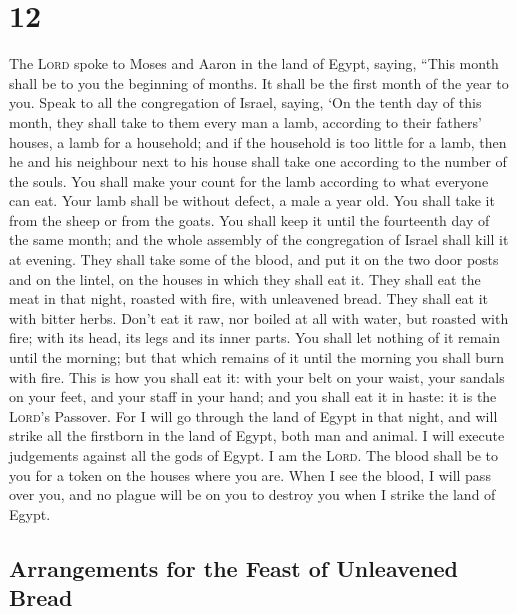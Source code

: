 \hypertarget{section-11}{%
\section{12}\label{section-11}}

 The \textsc{Lord} spoke to Moses and Aaron in the land of
Egypt, saying,  ``This month shall be to you the beginning
of months. It shall be the first month of the year to you.
 Speak to all the congregation of Israel, saying, `On the
tenth day of this month, they shall take to them every man a lamb,
according to their fathers' houses, a lamb for a household;
 and if the household is too little for a lamb, then he
and his neighbour next to his house shall take one according to the
number of the souls. You shall make your count for the lamb according to
what everyone can eat.  Your lamb shall be without defect,
a male a year old. You shall take it from the sheep or from the goats.
 You shall keep it until the fourteenth day of the same
month; and the whole assembly of the congregation of Israel shall kill
it at evening.  They shall take some of the blood, and put
it on the two door posts and on the lintel, on the houses in which they
shall eat it.  They shall eat the meat in that night,
roasted with fire, with unleavened bread. They shall eat it with bitter
herbs.  Don't eat it raw, nor boiled at all with water,
but roasted with fire; with its head, its legs and its inner parts.
 You shall let nothing of it remain until the morning;
but that which remains of it until the morning you shall burn with fire.
 This is how you shall eat it: with your belt on your
waist, your sandals on your feet, and your staff in your hand; and you
shall eat it in haste: it is the \textsc{Lord}'s Passover.
 For I will go through the land of Egypt in that night,
and will strike all the firstborn in the land of Egypt, both man and
animal. I will execute judgements against all the gods of Egypt. I am
the \textsc{Lord}.  The blood shall be to you for a token
on the houses where you are. When I see the blood, I will pass over you,
and no plague will be on you to destroy you when I strike the land of
Egypt.

\hypertarget{arrangements-for-the-feast-of-unleavened-bread}{%
\subsection{Arrangements for the Feast of Unleavened
Bread}\label{arrangements-for-the-feast-of-unleavened-bread}}

